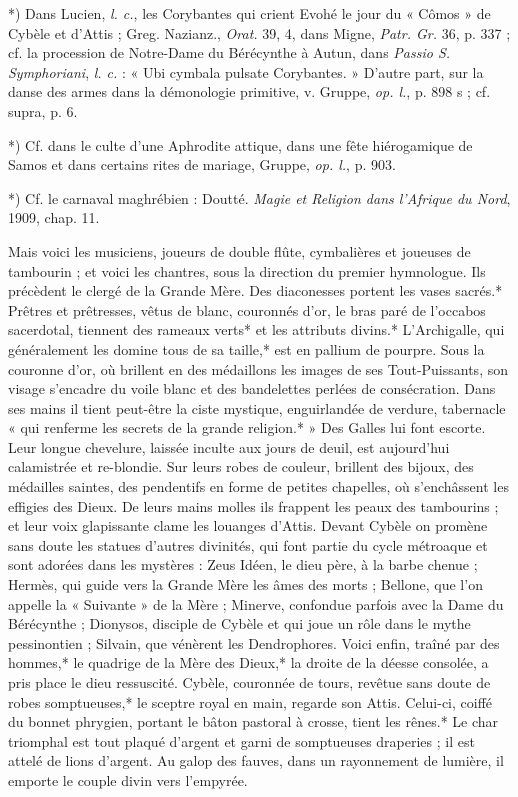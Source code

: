 \documentclass[a4paper, 11pt, oneside, polutonikogreek, french]{article}
\begin{document}
*) Dans Lucien, \emph{l. c.}, les Corybantes qui crient Evohé le jour du « Cômos » de Cybèle et d'Attis ; Greg. Nazianz., \emph{Orat.} 39, 4, dans Migne, \emph{Patr. Gr.} 36, p. 337 ; cf. la procession de Notre-Dame du Bérécynthe à Autun, dans \emph{Passio S. Symphoriani}, \emph{l. c.} : « Ubi cymbala pulsate Corybantes. » D'autre part, sur la danse des armes dans la démonologie primitive, v. Gruppe, \emph{op. l.}, p. 898 s ; cf. supra, p. 6.

*) Cf. dans le culte d'une Aphrodite attique, dans une fête hiérogamique de Samos et dans certains rites de mariage, Gruppe, \emph{op. l.}, p. 903.

*) Cf. le carnaval maghrébien : Doutté. \emph{Magie et Religion dans l'Afrique du Nord}, 1909, chap. 11.

Mais voici les musiciens, joueurs de double flûte, cymbalières et joueuses de tambourin ; et voici les chantres, sous la direction du premier hymnologue. Ils précèdent le clergé de la Grande Mère. Des diaconesses portent les vases sacrés.* Prêtres et prêtresses, vêtus de blanc, couronnés d'or, le bras paré de l'occabos sacerdotal, tiennent des rameaux verts* et les attributs divins.* L'Archigalle, qui généralement les domine tous de sa taille,* est en pallium de pourpre. Sous la couronne d'or, où brillent en des médaillons les images de ses Tout-Puissants, son visage s'encadre du voile blanc et des bandelettes perlées de consécration. Dans ses mains il tient peut-être la ciste mystique, enguirlandée de verdure, tabernacle « qui renferme les secrets de la grande religion.* » Des Galles lui font escorte. Leur longue chevelure, laissée inculte aux jours de deuil, est aujourd'hui calamistrée et re-blondie. Sur leurs robes de couleur, brillent des bijoux, des médailles saintes, des pendentifs en forme de petites chapelles, où s'enchâssent les effigies des Dieux. De leurs mains molles ils frappent les peaux des tambourins ; et leur voix glapissante clame les louanges d'Attis. Devant Cybèle on promène sans doute les statues d'autres divinités, qui font partie du cycle métroaque et sont adorées dans les mystères : Zeus Idéen, le dieu père, à la barbe chenue ; Hermès, qui guide vers la Grande Mère les âmes des morts ; Bellone, que l'on appelle la « Suivante » de la Mère ; Minerve, confondue parfois avec la Dame du Bérécynthe ; Dionysos, disciple de Cybèle et qui joue un rôle dans le mythe pessinontien ; Silvain, que vénèrent les Dendrophores. Voici enfin, traîné par des hommes,* le quadrige de la Mère des Dieux,* la droite de la déesse consolée, a pris place le dieu ressuscité. Cybèle, couronnée de tours, revêtue sans doute de robes somptueuses,* le sceptre royal en main, regarde son Attis. Celui-ci, coiffé du bonnet phrygien, portant le bâton pastoral à crosse, tient les rênes.* Le char triomphal est tout plaqué d'argent et garni de somptueuses draperies ; il est attelé de lions d'argent. Au galop des fauves, dans un rayonnement de lumière, il emporte le couple divin vers l'empyrée.
\end{document}
